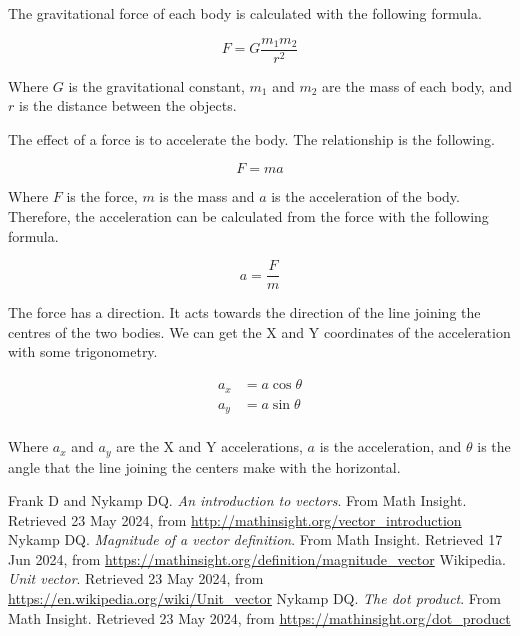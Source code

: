 \documentclass{amsart}
\begin{document}
The gravitational force of each body is calculated with the following formula.

\begin{displaymath}
  F = G \frac{m_1m_2}{r^2}
\end{displaymath}

Where $G$ is the gravitational constant, $m_1$ and $m_2$ are the mass of
each body, and $r$ is the distance between the objects.

The effect of a force is to accelerate the body. The relationship is the
following.

\begin{displaymath}
  F = m a
\end{displaymath}

Where $F$ is the force, $m$ is the mass and $a$ is the acceleration of
the body. Therefore, the acceleration can be calculated from the force with the
following formula.

\begin{displaymath}
  a = \frac{F}{m}
\end{displaymath}

The force has a direction. It acts towards the direction of the line joining
the centres of the two bodies. We can get the X and Y coordinates of the
acceleration with some trigonometry.

\begin{align*}
  a_x &= a \cos \theta \\
  a_y &= a \sin \theta \\
\end{align*}

Where $a_x$ and $a_y$ are the X and Y accelerations, $a$ is the
acceleration, and $\theta$ is the angle that the line joining the centers make
with the horizontal.


\newpage
\begin{thebibliography}{9}
  Frank D and Nykamp DQ. \textit{An introduction to vectors}. From Math
  Insight. Retrieved 23 May 2024, from
  \url{http://mathinsight.org/vector_introduction}
  Nykamp DQ. \textit{Magnitude of a vector definition}. From Math
  Insight. Retrieved 17 Jun 2024, from
  \url{https://mathinsight.org/definition/magnitude_vector}
  Wikipedia. \textit{Unit vector}. Retrieved 23 May 2024, from
  \url{https://en.wikipedia.org/wiki/Unit_vector}
  Nykamp DQ. \textit{The dot product}. From Math Insight. Retrieved 23 May 2024,
  from \url{https://mathinsight.org/dot_product}
\end{thebibliography}
\end{document}
